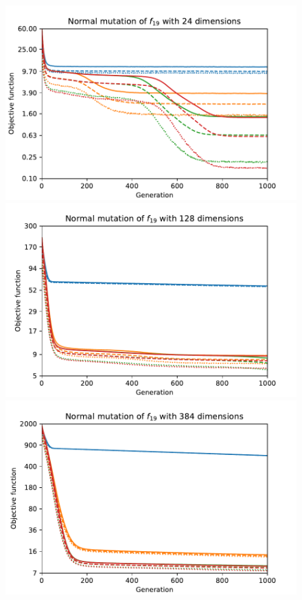 \begin{figure}[ht!]
    \begin{minipage}[t]{0.32\textwidth}
        \centering
        \includegraphics[width=\textwidth]{img/runs/fitness_es_mutation_f19_dim24_AddFromNormal.pdf}
    \end{minipage}
    \hfill
    \begin{minipage}[t]{0.32\textwidth}
        \centering
        \includegraphics[width=\textwidth]{img/runs/fitness_es_mutation_f19_dim128_AddFromNormal.pdf}
    \end{minipage}
    \hfill
    \begin{minipage}[t]{0.32\textwidth}
        \centering
        \includegraphics[width=\textwidth]{img/runs/fitness_es_mutation_f19_dim384_AddFromNormal.pdf}
    \end{minipage}


\end{figure}
